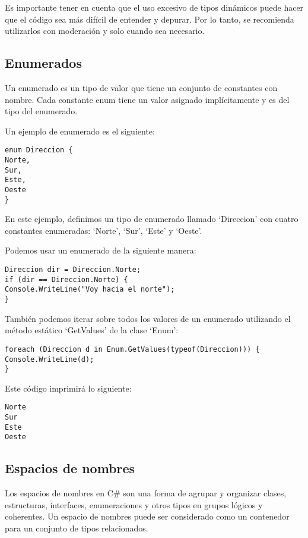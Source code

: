 \documentclass[executivepaper]{article}
\begin{document}
Es importante tener en cuenta que el uso excesivo de tipos dinámicos puede hacer que el código sea más difícil de entender y depurar. Por lo tanto, se recomienda utilizarlos con moderación y solo cuando sea necesario.

\subsection{Enumerados}

Un enumerado es un tipo de valor que tiene un conjunto de constantes con nombre. Cada constante enum tiene un valor asignado implícitamente y es del tipo del enumerado.

Un ejemplo de enumerado es el siguiente:

\begin{lstlisting}
enum Direccion {
Norte,
Sur,
Este,
Oeste
}
\end{lstlisting}

En este ejemplo, definimos un tipo de enumerado llamado \enquote*{Direccion} con cuatro constantes enumeradas: \enquote*{Norte}, \enquote*{Sur}, \enquote*{Este} y \enquote*{Oeste}.

Podemos usar un enumerado de la siguiente manera:

\begin{lstlisting}
Direccion dir = Direccion.Norte;
if (dir == Direccion.Norte) {
Console.WriteLine("Voy hacia el norte");
}
\end{lstlisting}

También podemos iterar sobre todos los valores de un enumerado utilizando el método estático \enquote*{GetValues} de la clase \enquote*{Enum}:

\begin{lstlisting}
foreach (Direccion d in Enum.GetValues(typeof(Direccion))) {
Console.WriteLine(d);
}
\end{lstlisting}

Este código imprimirá lo siguiente:

\begin{lstlisting}
Norte
Sur
Este
Oeste
\end{lstlisting}

\subsection{Espacios de nombres}

Los espacios de nombres en C\# son una forma de agrupar y organizar clases, estructuras, interfaces, enumeraciones y otros tipos en grupos lógicos y coherentes. Un espacio de nombres puede ser considerado como un contenedor para un conjunto de tipos relacionados.
\end{document}
